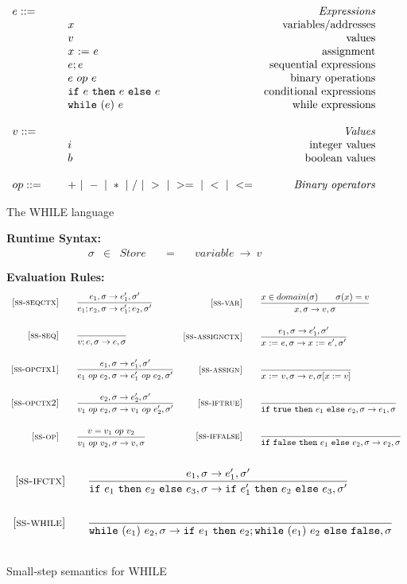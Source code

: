 \documentclass{article}
\makeatletter
\newcommand{\mydefhead}[2]{\multicolumn{2}{l}{{#1}}&\mbox{\emph{#2}}\\}
\newcommand{\mydefcase}[2]{\qquad\qquad& #1 &\mbox{#2}\\}
\newcommand{\assign}[2]{#1~{:=}~#2}
\newcommand{\ife}[3]{\mbox{\tt if}~{#1}~\mbox{\tt then}~{#2}~\mbox{\tt else}~{#3}}
\newcommand{\whilee}[2]{\mbox{\tt while}~(#1)~#2}
\newcommand{\true}{\mbox{\tt true}}
\newcommand{\false}{\mbox{\tt false}}
\newcommand{\rel}[1]{ \mbox{\sc [#1]} }
\newcommand{\ssrule}[3]{
  \rel{#1} &
  \frac{\strut\begin{array}{@{}c@{}} #2 \end{array}}
       {\strut\begin{array}{@{}c@{}} #3 \end{array}}
   \\~\\
}
\newcommand{\sstep}[4]{{#1},{#2} \rightarrow {#3},{#4}}
\makeatother
\begin{document}

\begin{figure}[H]
\caption{The WHILE language}\label{fig:lang}
\[
\begin{array}{llr}
  \mydefhead{e ::=\qquad\qquad\qquad\qquad}{Expressions}
  \mydefcase{x}{variables/addresses}
  \mydefcase{v}{values}
  \mydefcase{\assign x e}{assignment}
  \mydefcase{e; e}{sequential expressions}
  \mydefcase{e ~op~ e}{binary operations}
  \mydefcase{\ife e e e}{conditional expressions}
  \mydefcase{\whilee e e}{while expressions}
  \\
  \mydefhead{v ::=\qquad\qquad\qquad\qquad}{Values}
  \mydefcase{i}{integer values}
  \mydefcase{b}{boolean values}
  \\
  op ::= & + ~|~ - ~|~ * ~|~ / ~|~ > ~|~ >= ~|~ < ~|~ <=  & \mbox{\emph{Binary operators}} \\
\end{array}
\]
\end{figure}

\begin{figure}[H]
\caption{Small-step semantics for WHILE}\label{fig:smallstep}
{\bf Runtime Syntax:}
\[
\begin{array}{rclcl}
  \sigma & \in & {Store} \quad  & = & \quad {variable} ~\rightarrow ~v \\
  \\
\end{array}
\]
{\bf Evaluation Rules:~~~ \fbox{$\sstep{e}{\sigma}{e'}{\sigma'}$}} \\
\[
\begin{array}{r@{\qquad}l}
\ssrule{ss-seqctx}{
  \sstep{e_1}{\sigma}{e_1'}{\sigma'}
}{
  \sstep{e_1;e_2}{\sigma}{e_1';e_2}{\sigma'}
}
\ssrule{ss-seq}{
}{
  \sstep{v;e}{\sigma}{e}{\sigma}
}
\ssrule{ss-opctx1}{
  \sstep{e_1}{\sigma}{e_1'}{\sigma'}
}{
  \sstep{e_1~op~e_2}{\sigma}{e_1'~op~e_2}{\sigma'}
}
\ssrule{ss-opctx2}{
  \sstep{e_2}{\sigma}{e_2'}{\sigma'}
}{
  \sstep{v_1~op~e_2}{\sigma}{v_1~op~e_2'}{\sigma'}
}
\ssrule{ss-op}{
  v = v_1 ~op~ v_2
}{
  \sstep{v_1~op~v_2}{\sigma}{v}{\sigma}
}
\end{array}
\begin{array}{r@{\qquad}l}
\ssrule{ss-var}{
  x \in domain(\sigma) \qquad \sigma(x)=v
}{
  \sstep{x}{\sigma}{v}{\sigma}
}
\ssrule{ss-assignctx}{
  \sstep{e_1}{\sigma}{e_1'}{\sigma'}
}{
  \sstep{\assign{x}{e}}{\sigma}{\assign{x}{e'}}{\sigma'}
}
\ssrule{ss-assign}{
}{
  \sstep{\assign{x}{v}}{\sigma}{v}{\sigma[x:=v]}
}
\ssrule{ss-iftrue}{
}{
  \sstep{\ife{\true}{e_1}{e_2}}{\sigma}{e_1}{\sigma}
}
\ssrule{ss-iffalse}{
}{
  \sstep{\ife{\false}{e_1}{e_2}}{\sigma}{e_2}{\sigma}
}
\end{array}
\]
\[
\begin{array}{r@{\qquad}l}
\ssrule{ss-ifctx}{
  \sstep{e_1}{\sigma}{e_1'}{\sigma'}
}{
  \sstep{\ife{e_1}{e_2}{e_3}}{\sigma}{\ife{e_1'}{e_2}{e_3}}{\sigma'}
}
\ssrule{ss-while}{
}{
  \sstep{\whilee{e_1}{e_2}}{\sigma}{\ife{e_1}{e_2;\whilee{e_1}{e_2}}{\false}}{\sigma}
}
\end{array}
\]
\end{figure}
\end{document}
